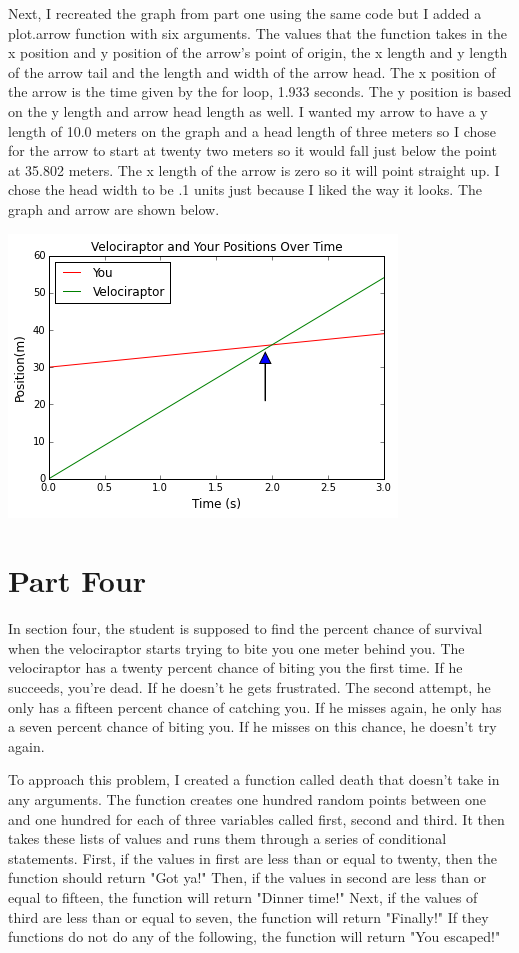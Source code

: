\documentclass[twocolumn]{revtex4}
\begin{document}
Next, I recreated the graph from part one using the same code but I added a plot.arrow function with six arguments. The values that the function takes in the x position and y position of the arrow's point of origin, the x length and y length of the arrow tail and the length and width of the arrow head. The x position of the arrow is the time given by the for loop, 1.933 seconds. The y position is based on the y length and arrow head length as well. I wanted my arrow to have a y length of 10.0 meters on the graph and a head length of three meters so I chose for the arrow to start at twenty two meters so it would fall just below the point at 35.802 meters. The x length of the arrow is zero so it will point straight up. I chose the head width to be .1 units just because I liked the way it looks. The graph and arrow are shown below.

\includegraphics[scale=.6]{graph2.png}


\section{Part Four}
In section four, the student is supposed to find the percent chance of survival when the velociraptor starts trying to bite you one meter behind you. The velociraptor has a twenty percent chance of biting you the first time. If he succeeds, you're dead. If he doesn't he gets frustrated. The second attempt, he only has a fifteen percent chance of catching you. If he misses again, he only has a seven percent chance of biting you. If he misses on this chance, he doesn't try again.

To approach this problem, I created a function called death that doesn't take in any arguments. The function creates one hundred random points between one and one hundred for each of three variables called first, second and third. It then takes these lists of values and runs them through a series of conditional statements. First, if the values in first are less than or equal to twenty, then the function should return "Got ya!" Then, if the values in second are less than or equal to fifteen, the function will return "Dinner time!" Next, if the values of third are less than or equal to seven, the function will return "Finally!" If they functions do not do any of the following, the function will return "You escaped!"
\end{document}
